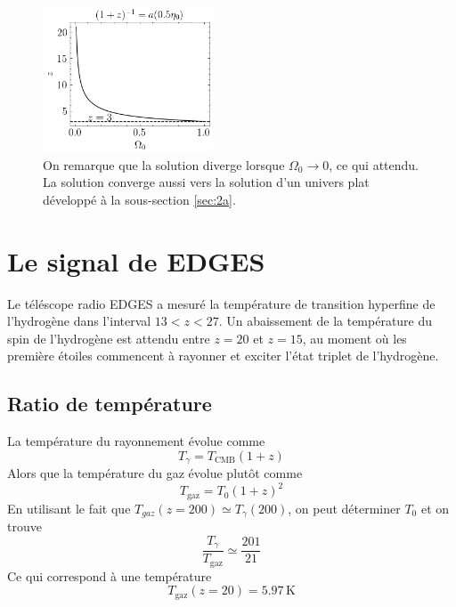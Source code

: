 \documentclass{article}
\numberwithin{equation}{section}
\begin{document}
\begin{figure}[H]
        \centering
        \includegraphics[width=0.45\textwidth]{numero2c_sol}
        \caption{On remarque que la solution diverge lorsque $\Omega_0 \rightarrow 0$, 
        ce qui attendu. La solution converge aussi vers la solution d'un 
univers plat développé à la sous-section \ref{sec:2a}.}
        \label{fig:z_miroir}
\end{figure}



\section{Le signal de EDGES}
Le téléscope radio EDGES a mesuré la température de transition hyperfine 
de l'hydrogène dans l'interval $13 < z < 27$. Un abaissement de la température 
du spin de l'hydrogène est attendu entre $z=20$ et $z=15$, au moment où les 
première étoiles commencent à rayonner et exciter l'état triplet de l'hydrogène.

\subsection{Ratio de température}
La température du rayonnement évolue comme
\[
        T_\gamma = T_{\text{CMB}}(1 + z)
\]
Alors que la température du gaz évolue plutôt comme
\[
        T_{\text{gaz}} = T_0(1 + z)^{2}
\]
En utilisant le fait que $T_{gaz}(z=200) \simeq T_\gamma(200)$, on peut 
déterminer $T_0$ et on trouve
\[
        \boxed{\frac{T_\gamma}{T_{\text{gaz}}} \simeq \frac{201}{21}}
\]
Ce qui correspond à une température
\[
        T_{\text{gaz}}(z=20) = 5.97\, \text{K}
\]
\end{document}
